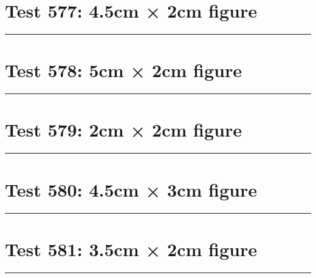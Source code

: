 \documentclass[a4paper,11pt]{article}
\begin{document}
\section*{Test 577: 4.5cm × 2cm figure}
\begin{swarmwrap}%
  \begin{minipage}[t]{4cm}
    \centering
    \rule{\linewidth}{2cm}
  \end{minipage}%
\end{swarmwrap}%
\swarmwrapnext
\lipsum[67]
\lipsum[68]
\lipsum[69]
\lipsum[70]
\lipsum[71]
\lipsum[72]
\section*{Test 578: 5cm × 2cm figure}
\begin{swarmwrap}%
  \begin{minipage}[t]{5cm}
    \centering
    \rule{\linewidth}{2cm}
  \end{minipage}%
\end{swarmwrap}%
\swarmwrapnext
\lipsum[150]
\lipsum[1]
\lipsum[2]
\lipsum[3]
\section*{Test 579: 2cm × 2cm figure}
\begin{swarmwrap}%
  \begin{minipage}[t]{2cm}
    \centering
    \rule{\linewidth}{2cm}
  \end{minipage}%
\end{swarmwrap}%
\swarmwrapnext
\lipsum[90]
\lipsum[91]
\lipsum[92]
\lipsum[93]
\lipsum[94]
\lipsum[95]
\section*{Test 580: 4.5cm × 3cm figure}
\begin{swarmwrap}%
  \begin{minipage}[t]{4cm}
    \centering
    \rule{\linewidth}{3cm}
  \end{minipage}%
\end{swarmwrap}%
\swarmwrapnext
\lipsum[19]
\lipsum[20]
\lipsum[21]
\section*{Test 581: 3.5cm × 2cm figure}
\begin{swarmwrap}%
  \begin{minipage}[t]{3cm}
    \centering
    \rule{\linewidth}{2cm}
  \end{minipage}%
\end{swarmwrap}%
\swarmwrapnext
\lipsum[106]
\lipsum[107]
\lipsum[108]
\lipsum[109]
\lipsum[110]
\end{document}
